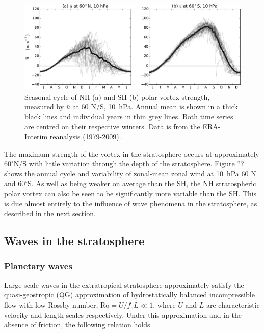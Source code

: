 \begin{figure}
 \centering
 \noindent\includegraphics[width=\textwidth]{figures/chapter-intro/zmzw_NH_SH.pdf}
 \caption[Comparison of NH and SH polar vortex seasonal cycle.]{Seasonal cycle
   of NH (a) and SH (b) polar vortex strength, measured by $\overline{u}$ at
   60$^{\circ}$N/S, 10~hPa. Annual mean is shown in a thick black lines and
   individual years in thin grey lines. Both time series are centred on their
   respective winters. Data is from the ERA-Interim reanalysis
   (1979-2009).}
 \label{fig:zmzw_NH_SH}
\end{figure}

The maximum strength of the vortex in the stratosphere occurs at approximately
$60^{\circ}$N/S with little variation through the depth of the
stratosphere. Figure ?? shows the annual cycle and variability of zonal-mean
zonal wind at 10~hPa $60^{\circ}$N and $60^{\circ}$S. As well as being weaker on
average than the SH, the NH stratospheric polar vortex can also be seen to be
significantly more variable than the SH. This is due almost entirely to the
influence of wave phenomena in the stratosphere, as described in the next
section.


\subsection{Waves in the stratosphere}
\label{sec:plan-waves-strat}

\subsubsection{Planetary waves}

Large-scale waves in the extratropical stratosphere approximately satisfy the
quasi-geostropic (QG) approximation of hydrostatically balanced incompressible
flow with low Rossby number, $\mathrm{Ro} = U/f_oL \ll 1$, where $U$ and $L$ are
characteristic velocity and length scales respectively. Under this
approximation and in the absence of friction, the following relation holds
\begin{equation}

\end{equation}




